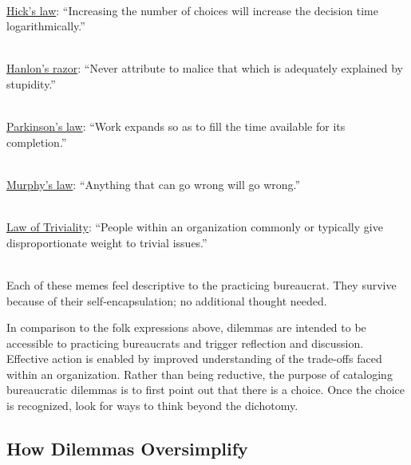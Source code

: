 \ \\
\href{https://en.wikipedia.org/wiki/Hick\%27s_law}{Hick's law}:
``Increasing the number of choices will increase the decision time logarithmically.''

\ \\
\href{https://en.wikipedia.org/wiki/Hanlon\%27s_razor}{Hanlon's razor}:
``Never attribute to malice that which is adequately explained by stupidity.''

\ \\
\href{https://en.wikipedia.org/wiki/Parkinson\%27s_law}{Parkinson's law}:
``Work expands so as to fill the time available for its completion.''

\ \\
\href{https://en.wikipedia.org/wiki/Murphy\%27s_law}{Murphy's law}:
 ``Anything that can go wrong will go wrong.''

\ \\
\href{https://en.wikipedia.org/wiki/Law_of_triviality}{Law of Triviality}:
``People within an organization commonly or typically give disproportionate weight to trivial issues.''

\ \\

Each of these memes feel descriptive to the practicing bureaucrat. They survive because of their self-encapsulation; no additional thought needed.

In comparison to the folk expressions above, dilemmas are intended to be accessible to practicing bureaucrats and trigger reflection and discussion. Effective action is enabled by improved understanding of the trade-offs faced within an organization. Rather than being reductive, the purpose of cataloging bureaucratic dilemmas is to first point out that there is a choice. Once the choice is recognized, look for ways to think beyond the dichotomy.

\subsection*{How Dilemmas Oversimplify}

